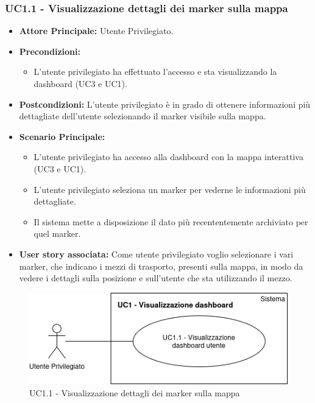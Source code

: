 \documentclass[11pt]{article}
\begin{document}
\begin{justify}
\subsubsection{\textbf{UC1.1 - Visualizzazione dettagli dei marker sulla mappa}}
\begin{itemize}
     \item \textbf{Attore Principale:} Utente Privilegiato.
     \item \textbf{Precondizioni:}
        \begin{itemize}
    		\item L'utente privilegiato ha effettuato l'accesso e sta      visualizzando la dashboard (UC3 e UC1).
        \end{itemize}
     \item \textbf{Postcondizioni:} L'utente privilegiato è in grado di ottenere informazioni più dettagliate dell'utente selezionando il marker visibile sulla mappa.
     \item \textbf{Scenario Principale:}
        \begin{itemize}
            \item L'utente privilegiato ha accesso alla dashboard con la mappa interattiva (UC3 e UC1).
            \item L'utente privilegiato seleziona un marker per vederne le informazioni più dettagliate.
            \item Il sistema mette a disposizione il dato più recententemente archiviato per quel marker.
        \end{itemize}
     \item \textbf{User story associata:}
     Come utente privilegiato voglio selezionare i vari marker, che indicano i mezzi di trasporto, presenti sulla mappa, in modo da vedere i dettagli sulla posizione e sull'utente che sta utilizzando il mezzo.
\end{itemize}
\begin{figure}[ht]
    \centering
    \includegraphics[width=0.5\linewidth]{UC1.1image.png}
    \caption{UC1.1 - Visualizzazione dettagli dei marker sulla mappa}
    \label{fig:UC1.1}
\end{figure}

\end{justify}
\end{document}
